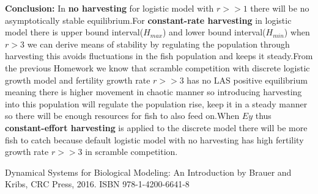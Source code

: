 \documentclass[12pt]{article}
\begin{document}
\begin{enumerate}
\textbf{Conclusion:}
In \textbf{no harvesting} for logistic model with $r>>1$ there will be no asymptotically stable equilibrium.For \textbf{constant-rate harvesting} in logistic model there is upper bound interval($H_{max}$) and lower bound interval($H_{min}$)  when $r>3$ we can derive means of stability by regulating the population through harvesting this avoids fluctuations in the fish population and keeps it steady.From the previous Homework we know that scramble competition with discrete logistic growth model and fertility growth rate $r>>3$ has no LAS  positive equilibrium meaning there is higher movement in chaotic manner so introducing harvesting into this population will regulate the population rise, keep it in a steady manner so there will be enough resources for fish to also feed on.When $Ey$ thus \textbf{constant-effort harvesting} is applied to the discrete model there will be more fish to catch because default logistic model with no harvesting has high fertility growth rate $r>>3$ in scramble competition.






\end{enumerate}

\cleardoublepage

\begin{thebibliography}{99}
Dynamical Systems for Biological Modeling: An Introduction by Brauer and Kribs, CRC Press, 2016. ISBN 978-1-4200-6641-8


\end{thebibliography}
\end{document}
